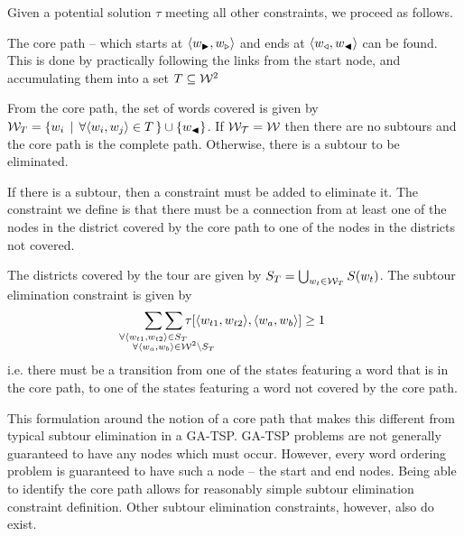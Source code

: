 \documentclass{standalone}
\begin{document}
Given a potential solution $\tau$ meeting all other constraints, we proceed as follows.

The core path -- which starts at $\langle w_{\blacktriangleright},w_{\triangleright}\rangle$
and ends at $\langle w_{\triangleleft},w_{\blacktriangleleft}\rangle$ can be found. This is done
by practically following the links from the start node, and accumulating
them into a set $T\subseteq\mathcal{W}^{2}$

From the core path, the set of words covered is given by $\mathcal{W}_{T}=\{w_{i}\,\mid\,\forall\langle w_{i},w_{j}\rangle\in T\,\}\cup\{w_{\blacktriangleleft}\}$.
If $\mathcal{W_{T}}=\mathcal{W}$ then there are no subtours and the core path
is the complete path. Otherwise, there is a subtour to be eliminated.

If there is a subtour, then a constraint must be
added to eliminate it. The constraint we define is that there must be a connection from at least one of the nodes in the district covered by the core path to
one of the nodes in the districts not covered.

The districts covered by the tour are given by $S_{T}=\bigcup_{w_{t}\in \mathcal{W}_{T}}S(w_{t})$. The subtour elimination constraint is given by 
\displayunskip
\begin{equation*}
  \sum_{\mathclap{\forall\langle w_{t1},w_{t2}\rangle\in S_{T}}}
  \sum_{\mathclap{\substack{\; \\ \;\\ \forall\langle w_{a},w_{b}\rangle\in\W^{2}\backslash S_{T}}}}
  \tau[\langle w_{t1},w_{t2}\rangle,\langle w_{a},w_{b}\rangle]\ge1
\end{equation*}
i.e. there must be a transition from one of the states featuring a
word that is in the core path, to one of the states featuring a word
not covered by the core path.


This formulation around the notion of a core path that makes this different from typical subtour elimination in a GA-TSP. GA-TSP problems are not generally guaranteed to have any nodes which must occur. However, every word ordering problem is guaranteed to have such a node -- the start and end nodes. Being able to identify the core path allows for reasonably simple subtour elimination constraint definition. Other subtour elimination constraints, however, also do exist.
\end{document}
